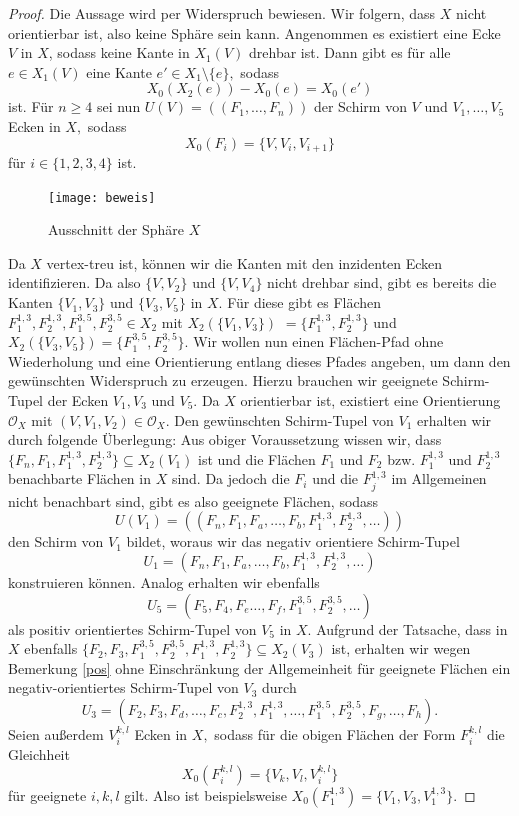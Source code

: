 \documentclass[12pt,titlepage,twoside,cleardoublepage]{article}
\theoremstyle{nummermitklammern}
\numberwithin{equation}{section}
\begin{document}
\begin{proof}
Die Aussage wird per Widerspruch bewiesen. Wir folgern, dass $X$ nicht orientierbar ist, also keine Sphäre sein kann.
Angenommen es existiert eine Ecke $V$ in $X$, sodass keine Kante in $X_1(V)$ drehbar ist. Dann gibt es für alle $e\in X_1(V)$ eine Kante $e'\in X_1\setminus \{e\},$ sodass 
\[
X_0(X_2(e))-X_0(e)=X_0(e')
\]
ist.
Für $n\geq 4$ sei nun $U(V)=((F_1,\ldots,F_n))$ der Schirm von $V$ und $V_1,\ldots,V_5$ Ecken in $X,$ sodass  
\[
X_0(F_i)=\{V,V_i,V_{i+1}\}
\] 
für $i\in\{1,2,3,4\}$ ist.
\begin{figure}[H]
\begin{center}
\texttt{[image: beweis]}
\end{center}
\caption{Ausschnitt der Sphäre $X$}
\end{figure} 
 Da $X$ vertex-treu ist, können wir die Kanten mit den inzidenten Ecken identifizieren. Da also $\{V,V_2\}$ und $\{V,V_4\}$ nicht drehbar sind, gibt es bereits die Kanten $\{V_1,V_3\}$ und $\{V_3,V_5\}$ in $X$. Für diese gibt es  Flächen $F^{1,3}_1,F^{1,3}_2,F^{3,5}_1,F^{3,5}_2\in X_2$ mit $X_2(\{V_1,V_3\})$ $=\{F^{1,3}_1,F^{1,3}_2\}$ und $X_2(\{V_3,V_5\})=\{F^{3,5}_1,F^{3,5}_2\}$. Wir wollen nun einen Flächen-Pfad ohne Wiederholung und eine Orientierung entlang dieses Pfades angeben, um dann den gewünschten Widerspruch zu erzeugen. Hierzu brauchen wir geeignete Schirm-Tupel der Ecken $V_1,V_3$ und $V_5.$ 
Da $X$ orientierbar ist, existiert eine Orientierung $\mathcal{O}_X$ mit $(V,V_1,V_2)\in \mathcal{O}_X.$
Den gewünschten Schirm-Tupel von $V_1$ erhalten wir durch folgende Überlegung: 
Aus obiger Voraussetzung wissen wir, dass $\{F_n,F_1,F_1^{1,3},F_2^{1,3}\}\subseteq X_2(V_1)$ ist und die Flächen $F_1$ und $F_2$ bzw. $F^{1,3}_1$ und $F^{1,3}_2$
benachbarte Flächen in $X$ sind. Da jedoch die $F_i$ und die $F_j^{1,3}$ im Allgemeinen nicht benachbart sind, gibt es also geeignete Flächen, sodass  
\[
U(V_1)=((F_n,F_1,F_a,\ldots,F_b,F^{1,3}_1,F^{1,3}_2,\ldots))
\]
den Schirm von $V_1$ bildet, woraus wir das negativ orientiere Schirm-Tupel
\[
U_1=(F_n,F_1,F_a,\ldots,F_b,F^{1,3}_1,F^{1,3}_2,\ldots)
\]  
konstruieren können.
Analog erhalten wir ebenfalls 
\[
U_5=(F_5,F_4,F_e\ldots,F_f,F^{3,5}_1,F^{3,5}_2,\ldots)
\] als positiv orientiertes Schirm-Tupel von $V_5$  in $X$. Aufgrund der Tatsache, dass in $X$ ebenfalls $\{F_2,F_3,F_1^{3,5},F_2^{3,5},F^{1,3}_1,F^{1,3}_2\}\subseteq X_2(V_3)$ ist,  erhalten wir wegen Bemerkung \ref{pos} ohne Einschränkung der Allgemeinheit für geeignete Flächen ein negativ-orientiertes Schirm-Tupel von $V_3$ durch
\[
U_3=(F_2,F_3,F_d,\ldots,F_c,F^{1,3}_2,F^{1,3}_1,\ldots,F_1^{3,5},F_2^{3,5},F_g,\ldots,F_h).
\]
Seien außerdem $V_i^{k,l}$ Ecken in $X,$ sodass für die obigen Flächen der Form $F_i^{k,l}$ die Gleichheit
\[
X_0(F^{k,l}_i)=\{V_k,V_l,V_i^{k,l}\}
\] für geeignete $i,k,l$ gilt. Also ist beispielsweise $X_0(F_1^{1,3})=\{V_1,V_3,V_1^{1,3}\}.$



\end{proof}
\end{document}
